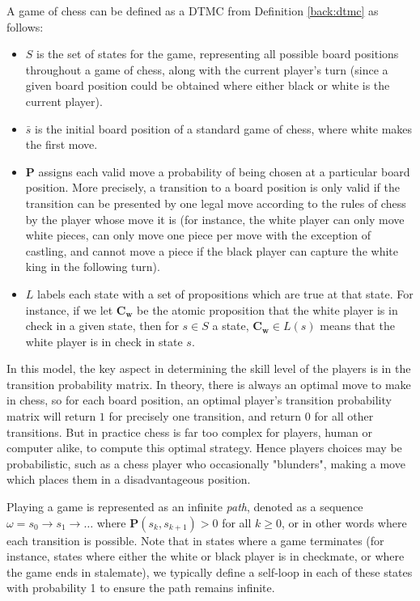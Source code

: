 \begin{example}
\label{back:chess}
    A game of chess can be defined as a DTMC from Definition \ref{back:dtmc} as follows:

    \begin{itemize}
        \item $S$ is the set of states for the game, representing all possible board positions throughout a game of chess, along with the current player's turn (since a given board position could be obtained where either black or white is the current player).
        \item $\bar{s}$ is the initial board position of a standard game of chess, where white makes the first move.
        \item $\mathbf{P}$ assigns each valid move a probability of being chosen at a particular board position. More precisely, a transition to a board position is only valid if the transition can be presented by one legal move according to the rules of chess by the player whose move it is (for instance, the white player can only move white pieces, can only move one piece per move with the exception of castling, and cannot move a piece if the black player can capture the white king in the following turn).
        \item $L$ labels each state with a set of propositions which are true at that state. For instance, if we let $\mathbf{C_w}$ be the atomic proposition that the white player is in check in a given state, then for $s \in S$ a state, $\mathbf{C_w} \in L(s)$ means that the white player is in check in state $s$.
    \end{itemize}

    In this model, the key aspect in determining the skill level of the players is in the transition probability matrix. In theory, there is always an optimal move to make in chess, so for each board position, an optimal player's transition probability matrix will return $1$ for precisely one transition, and return $0$ for all other transitions. But in practice chess is far too complex for players, human or computer alike, to compute this optimal strategy. Hence players choices may be probabilistic, such as a chess player who occasionally "blunders", making a move which places them in a disadvantageous position.
\end{example}

Playing a game is represented as an infinite \emph{path}, denoted as a sequence $\omega = s_0 \rightarrow s_1 \rightarrow \dots$ where $\mathbf{P}(s_k, s_{k+1})>0$ for all $k\geq0$, or in other words where each transition is possible. Note that in states where a game terminates (for instance, states where either the white or black player is in checkmate, or where the game ends in stalemate), we typically define a self-loop in each of these states with probability 1 to ensure the path remains infinite.

